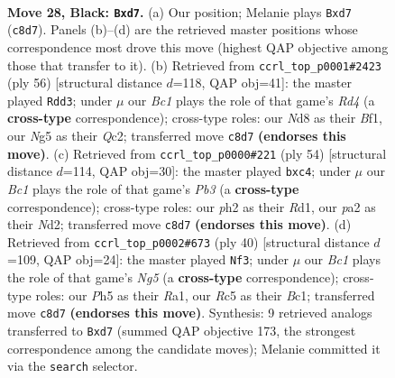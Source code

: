 \documentclass[11pt]{article}
\begin{document}
\clearpage

\begin{figure}[p]\centering
\begin{subfigure}{0.46\textwidth}\centering
\resizebox{\linewidth}{!}{%
\newchessgame
\chessboard[
  setfen={r1bn1k2/1p1P1pp1/p2q4/2r3np/QB5N/4P1P1/PP2RPBP/1R4K1 b - - 0 28},
  showmover=false,
  pgfstyle=straightmove, color=movearrow, markmove={c8-d7}
]}
\caption{}
\end{subfigure}\hfill
\begin{subfigure}{0.46\textwidth}\centering
\resizebox{\linewidth}{!}{%
\newchessgame
\chessboard[
  setfen={3rkb1r/5p2/p2p4/2p3np/P1NRPqb1/B1P1R3/2Q2PP1/5BK1 w k - 0 29},
  showmover=false,
  pgfstyle=straightmove, color=movearrow, markmove={d4-d3}
]}
\caption{}
\end{subfigure}
\\[4pt]
\begin{subfigure}{0.46\textwidth}\centering
\resizebox{\linewidth}{!}{%
\newchessgame
\chessboard[
  setfen={3r1bk1/5p1p/2qprnp1/2p5/2p5/1P1RPP1P/2QN2PB/3R2K1 w - - 0 28},
  showmover=false,
  pgfstyle=straightmove, color=movearrow, markmove={b3-c4}
]}
\caption{}
\end{subfigure}\hfill
\begin{subfigure}{0.46\textwidth}\centering
\resizebox{\linewidth}{!}{%
\newchessgame
\chessboard[
  setfen={r1b1kb1r/1p3p2/1q2p1pp/3pP1N1/7Q/Pp5P/1P3PP1/R1B1R1K1 w kq - 0 21},
  showmover=false,
  pgfstyle=straightmove, color=movearrow, markmove={g5-f3}
]}
\caption{}
\end{subfigure}
\caption{\textbf{Move 28, Black: \texttt{Bxd7}.} (a) Our position; Melanie plays \texttt{Bxd7} (\texttt{c8d7}). Panels (b)--(d) are the retrieved master positions whose correspondence most drove this move (highest QAP objective among those that transfer to it). (b) Retrieved from \texttt{ccrl\_top\_p0001\#2423} (ply 56) [structural distance $d$=118, QAP obj=41]: the master played \texttt{Rdd3}; under $\mu$ our \emph{Bc1} plays the role of that game's \emph{Rd4} (a \textbf{cross-type} correspondence); cross-type roles: our \emph{N}d8 as their \emph{B}f1, our \emph{N}g5 as their \emph{Q}c2; transferred move \texttt{c8d7} \textbf{(endorses this move)}. (c) Retrieved from \texttt{ccrl\_top\_p0000\#221} (ply 54) [structural distance $d$=114, QAP obj=30]: the master played \texttt{bxc4}; under $\mu$ our \emph{Bc1} plays the role of that game's \emph{Pb3} (a \textbf{cross-type} correspondence); cross-type roles: our \emph{p}h2 as their \emph{R}d1, our \emph{p}a2 as their \emph{N}d2; transferred move \texttt{c8d7} \textbf{(endorses this move)}. (d) Retrieved from \texttt{ccrl\_top\_p0002\#673} (ply 40) [structural distance $d$=109, QAP obj=24]: the master played \texttt{Nf3}; under $\mu$ our \emph{Bc1} plays the role of that game's \emph{Ng5} (a \textbf{cross-type} correspondence); cross-type roles: our \emph{P}h5 as their \emph{R}a1, our \emph{R}c5 as their \emph{B}c1; transferred move \texttt{c8d7} \textbf{(endorses this move)}. Synthesis: 9 retrieved analogs transferred to \texttt{Bxd7} (summed QAP objective 173, the strongest correspondence among the candidate moves); Melanie committed it via the \texttt{search} selector.}
\label{fig:thought-m55}
\end{figure}
\end{document}
